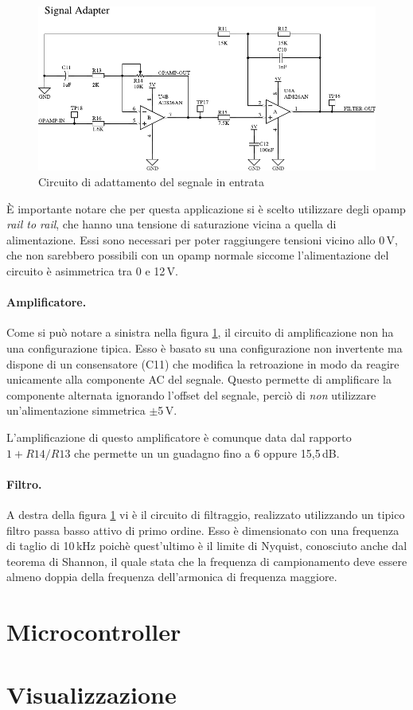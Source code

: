 \begin{figure}[H] \centering
    \includegraphics[width=.8\linewidth]{figures/circuits/filter-ampl.pdf}
    \caption{Circuito di adattamento del segnale in entrata \label{fig:filter-ampl}}
\end{figure}

\`E importante notare che per questa applicazione si \`e scelto utilizzare
degli opamp \emph{rail to rail}, che hanno una tensione di saturazione vicina
a quella di alimentazione. Essi sono necessari per poter raggiungere tensioni
vicino allo 0\,V, che non sarebbero possibili con un opamp normale siccome
l'alimentazione del circuito \`e asimmetrica tra 0 e 12\,V.

\paragraph{Amplificatore.} Come si pu\`o notare a sinistra nella figura
\ref{fig:filter-ampl}, il circuito di amplificazione non ha una configurazione
tipica. Esso \`e basato su una configurazione non invertente ma dispone di un
consensatore (C11) che modifica la retroazione in modo da reagire unicamente
alla componente AC del segnale. Questo permette di amplificare la componente
alternata ignorando l'offset del segnale, perci\`o di \emph{non} utilizzare
un'alimentazione simmetrica \(\pm\)5\,V.

L'amplificazione di questo amplificatore \`e comunque data dal rapporto
\(1+R14/R13\) che permette un un guadagno fino a 6 oppure 15,5\,dB.


\paragraph{Filtro.} A destra della figura \ref{fig:filter-ampl} vi \`e il
circuito di filtraggio, realizzato utilizzando un tipico filtro passa basso
attivo di primo ordine. Esso \`e dimensionato con una frequenza di taglio di
10\,kHz poich\`e quest'ultimo \`e il limite di Nyquist, conosciuto anche dal
teorema di Shannon, il quale stata che la frequenza di campionamento deve
essere almeno doppia della frequenza dell'armonica di frequenza maggiore.

\section{Microcontroller}

\section{Visualizzazione}
